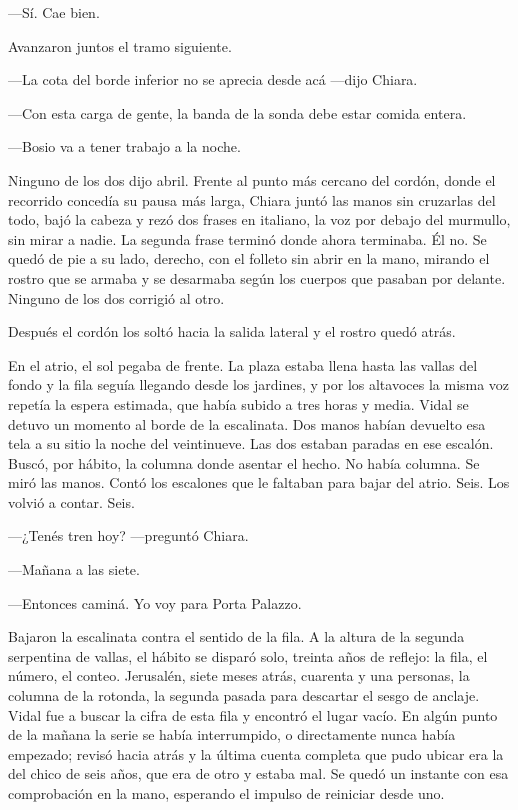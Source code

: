 ---Sí. Cae bien.

Avanzaron juntos el tramo siguiente.

---La cota del borde inferior no se aprecia desde acá ---dijo Chiara.

---Con esta carga de gente, la banda de la sonda debe estar comida entera.

---Bosio va a tener trabajo a la noche.

Ninguno de los dos dijo abril. Frente al punto más cercano del cordón, donde el recorrido concedía su pausa más larga, Chiara juntó las manos sin cruzarlas del todo, bajó la cabeza y rezó dos frases en italiano, la voz por debajo del murmullo, sin mirar a nadie. La segunda frase terminó donde ahora terminaba. Él no. Se quedó de pie a su lado, derecho, con el folleto sin abrir en la mano, mirando el rostro que se armaba y se desarmaba según los cuerpos que pasaban por delante. Ninguno de los dos corrigió al otro.

Después el cordón los soltó hacia la salida lateral y el rostro quedó atrás.

En el atrio, el sol pegaba de frente. La plaza estaba llena hasta las vallas del fondo y la fila seguía llegando desde los jardines, y por los altavoces la misma voz repetía la espera estimada, que había subido a tres horas y media. Vidal se detuvo un momento al borde de la escalinata. Dos manos habían devuelto esa tela a su sitio la noche del veintinueve. Las dos estaban paradas en ese escalón. Buscó, por hábito, la columna donde asentar el hecho. No había columna. Se miró las manos. Contó los escalones que le faltaban para bajar del atrio. Seis. Los volvió a contar. Seis.

---¿Tenés tren hoy? ---preguntó Chiara.

---Mañana a las siete.

---Entonces caminá. Yo voy para Porta Palazzo.

Bajaron la escalinata contra el sentido de la fila. A la altura de la segunda serpentina de vallas, el hábito se disparó solo, treinta años de reflejo: la fila, el número, el conteo. Jerusalén, siete meses atrás, cuarenta y una personas, la columna de la rotonda, la segunda pasada para descartar el sesgo de anclaje. Vidal fue a buscar la cifra de esta fila y encontró el lugar vacío. En algún punto de la mañana la serie se había interrumpido, o directamente nunca había empezado; revisó hacia atrás y la última cuenta completa que pudo ubicar era la del chico de seis años, que era de otro y estaba mal. Se quedó un instante con esa comprobación en la mano, esperando el impulso de reiniciar desde uno.

